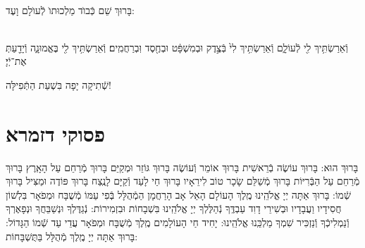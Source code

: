 \documentclass[twoside, openany, parskip=half, 11pt]{book}
\begin{document}
\\
בָּרוּךְ שֵׁם כְּֿבוֺד מַלְכוּתוֺ לְֿעוֺלָם וָעֶד:


\\
וְֿאֵרַשְׂתִּ֥יךְ לִ֖י לְֿעוֹלָ֑ם וְֿאֵרַשְׂתִּ֥יךְ לִי֙ בְּֿצֶ֣דֶק וּבְמִשְׁפָּ֔ט וּבְחֶ֖סֶד וּֽבְרַחֲמִֽים׃ וְֿאֵרַשְׂתִּ֥יךְ לִ֖י בֶּאֱמוּנָ֑ה וְֿיָדַ֖עַתְּ אֶת־יְֿיָ׃


\vfill

\begin{Large}
שְֿׁתִיקָה יָפָה בִּשְׁעַת הַתְּֿפִילָּה!
\end{Large}



\section[שחרית לחול]{ פסוקי דזמרא }



בָּרוּךְ הוּא:
בָּרוּךְ עוֹשֶׂה בְֿרֵאשִׁית בָּרוּךְ אוֹמֵר וְֿעוֹשֶׂה
בָּרוּךְ גּוֹזֵר וּמְקַיֵּם בָּרוּךְ מְֿרַחֵם עַל הָאָֽרֶץ
בָּרוּךְ מְֿרַחֵם עַל הַבְּֿרִיּוֹת בָּרוּךְ מְֿשַׁלֵּם שָׂכָר טוֹב לִירֵאָיו
בָּרוּךְ חַי לָעַד וְֿקַיָּם לָנֶֽצַח בָּרוּךְ פּוֹדֶה וּמַצִּיל בָּרוּךְ שְֿׁמוֹ:
בָּרוּךְ אַתָּה יְיָ אֱלֹהֵֽינוּ מֶֽלֶךְ הָעוֹלָם הָאֵל אָב הָרַחֲמָן הַמְֿהֻלָּל בְּֿפִי עַמּוֹ מְֿשֻׁבָּח וּמְפֹאָר בִּלְשׁוֹן חֲסִידָיו וַעֲבָדָיו וּבְשִׁירֵי דָוִד עַבְדֶּֽךָ נְֿהַלֶּלְךָ יְיָ אֱלֹהֵֽינוּ בִּשְׁבָחוֹת וּבִזְמִירוֹת: נְֿגַדֶּלְךָ וּנְשַׁבֵּחֲךָ וּנְפָאֶרְךָ וְֿנַמְלִיכְֿךָ וְֿנַזְכִּיר שִׁמְךָ מַלְכֵּֽנוּ אֱלֹהֵֽינוּ:
 יָחִיד חַי הָעוֹלָמִים מֶֽלֶךְ מְֿשֻׁבָּח וּמְפֹאָר עֲדֵי עַד שְֿׁמוֹ הַגָּדוֹל: בָּרוּךְ אַתָּה יְיָ מֶֽלֶךְ מְֿהֻלָּל בַּתֻּשְׁבָּחוֹת:
\end{document}
